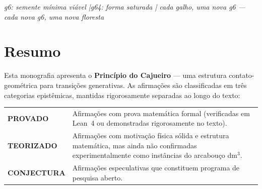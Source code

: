 \documentclass[12pt,a4paper,twoside]{book}
\theoremstyle{plain}
\theoremstyle{definition}
\theoremstyle{definition}
\begin{document}
\begin{center}

\vspace{0.4cm}
{\small\color{cajunavy}\itshape
g6: semente mínima viável \quad|\quad g64: forma saturada \quad|\quad
cada galho, uma nova g6 --- cada nova g6, uma nova floresta}
\end{center}
\newpage

\chapter*{Resumo}

Esta monografia apresenta o \textbf{Princípio do Cajueiro} --- uma estrutura
contato-geométrica para transições generativas. As afirmações são classificadas
em três categorias epistêmicas, mantidas rigorosamente separadas ao longo do
texto:

\medskip
\begin{center}
\begin{tabular}{lp{9cm}}
\colorbox{cajunavy!10}{\color{cajunavy}\bfseries\small PROVADO} &
  Afirmações com prova matemática formal (verificadas em Lean~4 ou
  demonstradas rigorosamente no texto). \\[4pt]
\colorbox{cajugold!20}{\color{cajugold!60!black}\bfseries\small TEORIZADO} &
  Afirmações com motivação física sólida e estrutura matemática, mas
  ainda não confirmadas experimentalmente como instâncias do arcabouço dm$^{3}$. \\[4pt]
\colorbox{cajured!10}{\color{cajured}\bfseries\small CONJECTURA} &
  Afirmações especulativas que constituem programa de pesquisa aberto. \\
\end{tabular}
\end{center}
\end{document}
